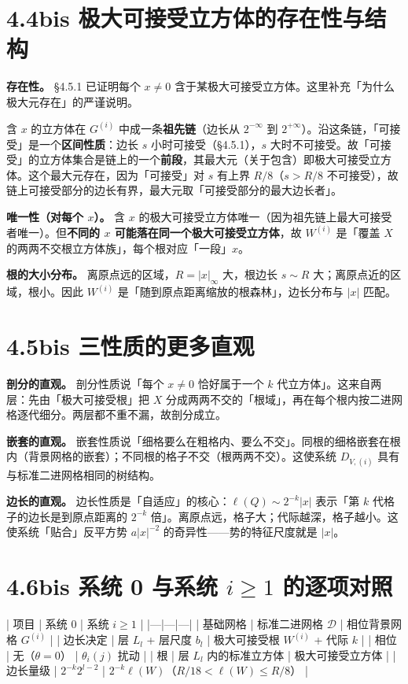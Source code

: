 \documentclass[a4paper,11pt,openany]{ctexbook}
\numberwithin{equation}{chapter}
\numberwithin{figure}{chapter}
\numberwithin{table}{chapter}
\begin{document}
\section{4.4bis 极大可接受立方体的存在性与结构}

\textbf{存在性。} §4.5.1 已证明每个 $x\neq0$ 含于某极大可接受立方体。这里补充「为什么极大元存在」的严谨说明。

含 $x$ 的立方体在 $G^{(i)}$ 中成一条\textbf{祖先链}（边长从 $2^{-\infty}$ 到 $2^{+\infty}$）。沿这条链，「可接受」是一个\textbf{区间性质}：边长 $s$ 小时可接受（§4.5.1），$s$ 大时不可接受。故「可接受」的立方体集合是链上的一个\textbf{前段}，其最大元（关于包含）即极大可接受立方体。这个最大元存在，因为「可接受」对 $s$ 有上界 $R/8$（$s>R/8$ 不可接受），故链上可接受部分的边长有界，最大元取「可接受部分的最大边长者」。

\textbf{唯一性（对每个 $x$）。} 含 $x$ 的极大可接受立方体唯一（因为祖先链上最大可接受者唯一）。但\textbf{不同的 $x$ 可能落在同一个极大可接受立方体}，故 $W^{(i)}$ 是「覆盖 $X$ 的两两不交根立方体族」，每个根对应「一段」$x$。

\textbf{根的大小分布。} 离原点远的区域，$R=|x|_\infty$ 大，根边长 $s\sim R$ 大；离原点近的区域，根小。因此 $W^{(i)}$ 是「随到原点距离缩放的根森林」，边长分布与 $|x|$ 匹配。

\section{4.5bis 三性质的更多直观}

\textbf{剖分的直观。} 剖分性质说「每个 $x\neq0$ 恰好属于一个 $k$ 代立方体」。这来自两层：先由「极大可接受根」把 $X$ 分成两两不交的「根域」，再在每个根内按二进网格逐代细分。两层都不重不漏，故剖分成立。

\textbf{嵌套的直观。} 嵌套性质说「细格要么在粗格内、要么不交」。同根的细格嵌套在根内（背景网格的嵌套）；不同根的格子不交（根两两不交）。这使系统 $D_{V,(i)}$ 具有与标准二进网格相同的树结构。

\textbf{边长的直观。} 边长性质是「自适应」的核心：$\ell(Q)\sim2^{-k}|x|$ 表示「第 $k$ 代格子的边长是到原点距离的 $2^{-k}$ 倍」。离原点远，格子大；代际越深，格子越小。这使系统「贴合」反平方势 $a|x|^{-2}$ 的奇异性——势的特征尺度就是 $|x|$。

\section{4.6bis 系统 0 与系统 $i\ge1$ 的逐项对照}

| 项目 | 系统 0 | 系统 $i\ge1$ |
|---|---|---|
| 基础网格 | 标准二进网格 $\mathcal D$ | 相位背景网格 $G^{(i)}$ |
| 边长决定 | 层 $L_l$ + 层尺度 $b_l$ | 极大可接受根 $W^{(i)}$ + 代际 $k$ |
| 相位 | 无（$\theta=0$） | $\theta_i(j)$ 扰动 |
| 根 | 层 $L_l$ 内的标准立方体 | 极大可接受立方体 |
| 边长量级 | $2^{-k}2^{l-2}$ | $2^{-k}\ell(W)$（$R/18<\ell(W)\le R/8$） |
\end{document}
